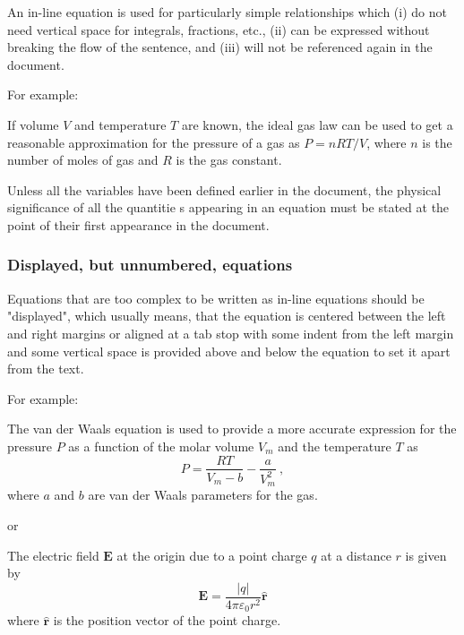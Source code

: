 An in-line equation is used for particularly simple relationships which (i) do not need vertical space for integrals, fractions, etc., (ii) can be expressed without breaking the flow of the sentence, and (iii) will not be referenced again in the document.

For example:

\begin{IMleftrightskip}
If volume $V$ and temperature $T$ are known, the ideal gas law can be used to get a reasonable approximation for the pressure of a gas as $P=nRT/V$, where $n$ is the number of moles of gas and $R$ is the gas constant.
\end{IMleftrightskip}

Unless all the variables have been defined earlier in the document, the physical significance of all the quantitie s appearing in an equation must be stated at the point of their first appearance in the document.

\subsubsection*{Displayed, but unnumbered, equations}
\label{sec:diuneq}

Equations that are too complex to be written as in-line equations should be "displayed", which usually means, that the equation is centered between the left and right margins or aligned at a tab stop
with some indent from the left margin and some vertical space is provided above and below the equation to set it apart from the text.

For example:


\begin{IMleftrightskip}
The van der Waals equation is used to provide a more accurate expression for the pressure $P$ as a function of the molar volume $V_m$ and the temperature $T$ as
%
\begin{equation*}
P = \frac{RT}{V_m-b}-\frac{a}{V_m^2}~,
\end{equation*}
%
where $a$ and $b$ are van der Waals parameters for the gas.

or

The electric field $\mathbf{E}$ at the origin due to a point charge $q$ at a distance $r$ is given by
%
\begin{equation*}
\mathbf{E} = \frac{|q|}{4\pi\varepsilon_0 r^2}\mathbf{\hat{r}}
\end{equation*}
where $\mathbf{\hat{r}}$ is the position vector of the point charge.
\end{IMleftrightskip}

